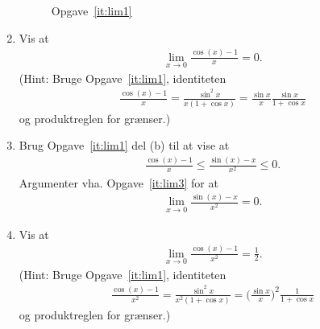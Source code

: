 \begin{enumerate}
\begin{figure}
		\caption{Opgave~\ref{it:lim1}}
		\label{fig:lim1}
	\end{figure}

	\item\label{it:lim3} Vis at 
	\begin{align*}
	\lim_{x\to 0}\frac{\cos (x)-1}{x}=0.
	\end{align*} 
	(Hint: Bruge Opgave~\ref{it:lim1}, identiteten
	\begin{align*}
	\frac{\cos (x)-1}{x}=\frac{\sin^2 x}{x(1+\cos x)}= \frac{\sin x}{x}\frac{\sin x}{1+\cos x}
	\end{align*}
	og produktreglen for grænser.)
	
	\item \label{it:lim4} Brug Opgave~\ref{it:lim1} del (b) til at vise at
	\begin{align*}
	\frac{\cos(x)-1}{x}\leq \frac{\sin(x)-x}{x^2}\leq 0.
	\end{align*}
	Argumenter vha. Opgave~\ref{it:lim3} for at 
	\begin{align*}
	\lim_{x\to 0}\frac{\sin(x)-x}{x^2}=0.
	\end{align*}
	
	\item\label{it:lim5} Vis at 
	\begin{align*}
	\lim_{x\to 0}\frac{\cos (x)-1}{x^2}=\frac{1}{2}.
	\end{align*} 
	(Hint: Bruge Opgave~\ref{it:lim1}, identiteten
	\begin{align*}
	\frac{\cos (x)-1}{x^2}=\frac{\sin^2 x}{x^2(1+\cos x)}= \Big(\frac{\sin x}{x}\Big)^2\frac{1}{1+\cos x}
	\end{align*}
	og produktreglen for grænser.)	
		
	
\end{enumerate}
